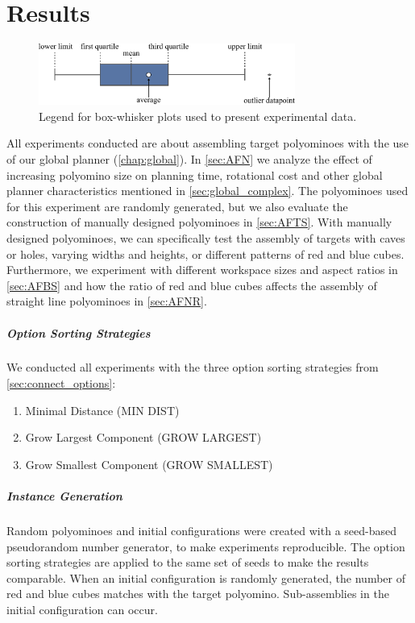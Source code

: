 \chapter{Results}
\label{chap:results}

\begin{figure}
	\centering
	\includegraphics[width=0.75\textwidth]{figures/plots/box_whisker_legend.pdf}
	\caption[Legend for box-whisker plots]{Legend for box-whisker plots used to present experimental data.}
	\label{fig:bw_legend}
\end{figure}

All experiments conducted are about assembling target polyominoes with the use of our global planner (\autoref{chap:global}).
In \autoref{sec:AFN} we analyze the effect of increasing polyomino size on planning time, rotational cost and other global planner characteristics mentioned in \autoref{sec:global_complex}.
The polyominoes used for this experiment are randomly generated, but we also evaluate the construction of manually designed polyominoes in \autoref{sec:AFTS}.
With manually designed polyominoes, we can specifically test the assembly of targets with caves or holes, varying widths and heights, or different patterns of red and blue cubes. 
Furthermore, we experiment with different workspace sizes and aspect ratios in \autoref{sec:AFBS} and how the ratio of red and blue cubes affects the assembly of straight line polyominoes in \autoref{sec:AFNR}.

\paragraph{Option Sorting Strategies}
We conducted all experiments with the three option sorting strategies from \autoref{sec:connect_options}:
\begin{enumerate}
	\item Minimal Distance (MIN DIST)
	\item Grow Largest Component (GROW LARGEST)
	\item Grow Smallest Component (GROW SMALLEST)
\end{enumerate}

\paragraph{Instance Generation}
Random polyominoes and initial configurations were created with a seed-based pseudorandom number generator, to make experiments reproducible.
The option sorting strategies are applied to the same set of seeds to make the results comparable.
When an initial configuration is randomly generated, the number of red and blue cubes matches with the target polyomino.
Sub-assemblies in the initial configuration can occur.

